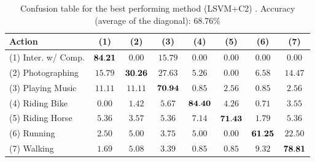 \documentclass{bmvc2k}
\newcommand{\green}[1]{#1} %
\newcommand{\ok}[1]{{\small \scriptsize  \color{mygreen} #1}} %
\newcommand{\bad}[1]{{\small \scriptsize  \color{red} #1}} %
\newcommand{\tablespc}{\vspace{-4mm}}
\newcommand{\tfs}{\small}   %
\newcommand{\cfs}{\small}   %
\begin{document}
\begin{small}
\begin{table}[tbp]
\centering
{}
\begin{tabular}{|l|c|c|c|c|c|c|c|}
\hline
\tfs Action           & \tfs$~~$(1)$~~$ & \tfs$~~$(2)$~~$ & \tfs$~~$(3)$~~$ & \tfs$~~$(4)$~~$ & \tfs$~~$(5)$~~$ & \tfs$~~$(6)$~~$ & \tfs$~~$(7)$~~$\\ \hline 
\tfs(1) Inter. w/ Comp. & \tfs${\bf 84.21}$ & \tfs$0.00$ & \tfs$15.79$ & \tfs$0.00$ & \tfs$0.00$ & \tfs$0.00$ & \tfs$0.00$\\ \hline 
\tfs(2) Photographing   & \tfs$15.79$ & \tfs${\bf 30.26}$ & \tfs$27.63$ & \tfs$5.26$ & \tfs$0.00$ & \tfs$6.58$ & \tfs$14.47$\\ \hline 
\tfs(3) Playing Music   & \tfs$11.11$ & \tfs$11.11$ & \tfs${\bf 70.94}$ & \tfs$0.85$ & \tfs$2.56$ & \tfs$0.85$ & \tfs$2.56$\\ \hline 
\tfs(4) Riding Bike     & \tfs$0.00$ & \tfs$1.42$ & \tfs$5.67$ & \tfs${\bf 84.40}$ & \tfs$4.26$ & \tfs$0.71$ & \tfs$3.55$\\ \hline 
\tfs(5) Riding Horse    & \tfs$5.36$ & \tfs$3.57$ & \tfs$5.36$ & \tfs$7.14$ & \tfs${\bf 71.43}$ & \tfs$1.79$ & \tfs$5.36$\\ \hline 
\tfs(6) Running         & \tfs$2.50$ & \tfs$5.00$ & \tfs$3.75$ & \tfs$5.00$ & \tfs$0.00$ & \tfs${\bf 61.25}$ & \tfs$22.50$\\ \hline 
\tfs(7) Walking         & \tfs$1.69$ & \tfs$5.08$ & \tfs$3.39$ & \tfs$0.85$ & \tfs$0.85$ & \tfs$9.32$ & \tfs${\bf 78.81}$\\ \hline 

\end{tabular}
\vspace{2mm}
\caption{\cfs Confusion table for the best performing method \green{(LSVM+C2) \normalsize}. 
Accuracy (average of the diagonal): 68.76\%
}
\label{tab:confusion_table}
\tablespc
\end{table}
\end{small}


\end{document}
